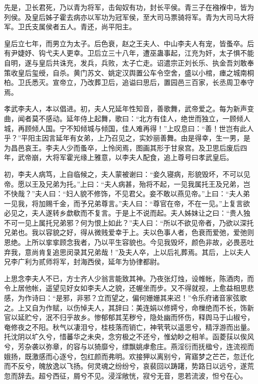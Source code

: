 \documentclass[12pt,UTF8]{ctexbook}
\begin{document}
先是，卫长君死，乃以青为将军，击匈奴有功，封长平侯。青三子在襁褓中，皆为列侯。及皇后姊子霍去病亦以军功为冠军侯，至大司马票骑将军。青为大司马大将军。卫氏支属侯者五人。青还，尚平阳主。



皇后立七年，而男立为太子。后色衰，赵之王夫人、中山李夫人有宠，皆蚤卒。后有尹婕妤、钩弋夫人更幸。卫后立三十八年，遭巫蛊事起，江充为奸，太子惧不能自明，遂与皇后共诛充，发兵，兵败，太子亡走。诏遣宗正刘长乐、执金吾刘敢奉策收皇后玺绶，自杀。黄门苏文、姚定汉舆置公车令空舍，盛以小棺，瘗之城南桐柏。卫氏悉灭。宣帝立，乃改葬卫后，追谥曰思后，置园邑三百家，长丞周卫奉守焉。



孝武李夫人，本以倡进。初，夫人兄延年性知音，善歌舞，武帝爱之。每为新声变曲，闻者莫不感动。延年侍上起舞，歌曰：“北方有佳人，绝世而独立，一顾倾人城，再顾倾人国。宁不知倾城与倾国，佳人难再得！”上叹息曰：“善！世岂有此人乎？”平阳主因言延年有女弟，上乃召见之，实妙丽善舞。由是得幸，生一男，是为昌邑哀王。李夫人少而蚤卒，上怜闵焉，图画其形于甘泉宫。及卫思后废后四年，武帝崩，大将军霍光缘上雅意，以李夫人配食，追上尊号曰孝武皇后。



初，李夫人病笃，上自临候之，夫人蒙被谢曰：“妾久寝病，形貌毁坏，不可以见帝。愿以王及兄弟为托。”上曰：“夫人病甚，殆将不起，一见我属托王及兄弟，岂不快哉？”夫人曰：“妇人貌不修饰，不见君父。妾不敢以燕见帝。”上曰：“夫人弟一见我，将加赐千金，而予兄弟尊言。”夫人曰：“尊官在帝，不在一见。”上复言欲必见之，夫人遂转乡歔欷而不复言。于是上不说而起。夫人姊妹让之曰：“贵人独不可一见上属托兄弟邪？何为恨上如此？”夫人曰：“所以不欲见帝者，乃欲以深托兄弟也。我以容貌之好，得从微贱爱幸于上。夫以色事人者，色衰而爱弛，爱弛则恩绝。上所以挛挛顾念我者，乃以平生容貌也。今见我毁坏，颜色非故，必畏恶吐弃我，意尚肯复追思闵录其兄弟哉！”及夫人卒，上以后礼葬焉。其后，上以夫人兄李广利为贰师将军，封海西侯，延年为协律都尉。



上思念李夫人不已，方士齐人少翁言能致其神。乃夜张灯烛，设帷帐，陈酒肉，而令上居他帐，遥望见好女如李夫人之貌，还幄坐而步。又不得就视，上愈益相思悲感，为作诗曰：“是邪，非邪？立而望之，偏何姗姗其来迟！”令乐府诸音家弦歌之。上又自为作赋，以伤悼夫人，其辞曰：美连娟以修嫮兮，命樔绝而不长，饰新官以延贮兮，泯不归乎故乡。惨郁郁其芜秽兮，隐处幽而怀伤，释舆马于山椒兮，奄修夜之不阳。秋气以凄泪兮，桂枝落而销亡，神茕茕以遥思兮，精浮游而出量。托沈阴以圹久兮，惜蕃华之未央，念穷极之不还兮，惟幼眇之相羊。函菱荴以俟风兮，芳杂袭以弥章，的容与以猗靡兮，缥飘姚虖愈庄。燕淫衍而抚楹兮，连流视而娥扬，既激感而心逐兮，包红颜而弗明。欢接狎以离别兮，宵寤梦之芒芒，忽迁化而不反兮，魄放逸以飞扬。何灵魂之纷纷兮，哀裴回以踌躇，势路日以远兮，遂荒忽而辞去。超兮西征，屑兮不见。浸淫敞恍，寂兮无音，思若流波，怛兮在心。
\end{document}
